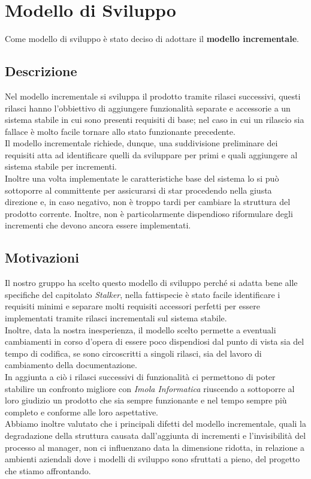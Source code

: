\section{Modello di Sviluppo}
Come modello di sviluppo è stato deciso di adottare il \textbf{modello incrementale}.
\subsection{Descrizione}
Nel modello incrementale si sviluppa il prodotto tramite rilasci successivi, questi rilasci hanno l'obbiettivo di aggiungere funzionalità separate e accessorie 
a un sistema stabile in cui sono presenti requisiti di base; nel caso in cui un rilascio sia fallace è molto facile tornare allo stato funzionante precedente.\\
Il modello incrementale richiede, dunque, una suddivisione preliminare dei requisiti atta ad identificare quelli da sviluppare per primi e quali aggiungere al sistema 
stabile per incrementi. \\
Inoltre una volta implementate le caratteristiche base del sistema lo si può sottoporre al committente per assicurarsi di star procedendo nella giusta direzione e, in caso negativo,
non è troppo tardi per cambiare la struttura del prodotto corrente. Inoltre, non è particolarmente dispendioso riformulare degli incrementi che devono ancora essere implementati. 

\subsection{Motivazioni}
Il nostro gruppo ha scelto questo modello di sviluppo perché si adatta bene alle specifiche del capitolato \textit{Stalker},
nella fattispecie  è stato facile identificare i requisiti minimi e separare molti requisiti accessori perfetti per essere implementati
tramite rilasci incrementali sul sistema stabile.\\
Inoltre, data la nostra inesperienza, il modello scelto permette a eventuali cambiamenti in corso d'opera di essere poco dispendiosi dal punto di vista
sia del tempo di codifica, se sono circoscritti a singoli rilasci, sia del lavoro di cambiamento della documentazione. \\
In aggiunta a ciò i rilasci successivi di funzionalità ci permettono di poter stabilire un confronto migliore con \textit{Imola Informatica}
riuscendo a sottoporre al loro giudizio un prodotto che sia sempre funzionante e nel tempo sempre più completo e conforme alle loro aspettative. \\
Abbiamo inoltre valutato che i principali difetti del modello incrementale, quali la degradazione della struttura causata dall'aggiunta di 
incrementi e l'invisibilità del processo al manager, non ci influenzano data la dimensione ridotta, in relazione a 
ambienti aziendali dove i modelli di sviluppo sono sfruttati a pieno, del progetto che stiamo affrontando.
 
